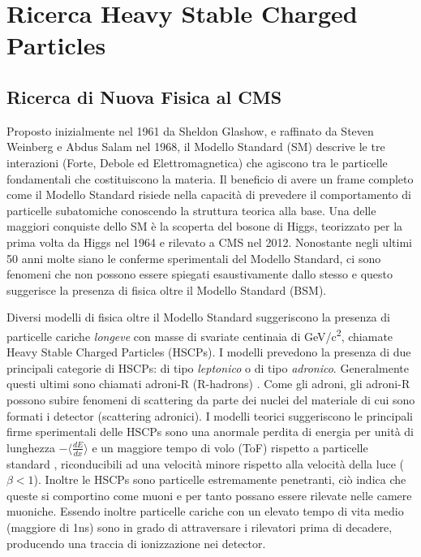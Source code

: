 \chapter{Ricerca Heavy Stable Charged Particles}
\label{cap:TerzoCapitolo}

\section{Ricerca di Nuova Fisica al CMS}
\label{sec:NewPhysics}

Proposto inizialmente nel 1961 da Sheldon Glashow, e raffinato da Steven Weinberg e Abdus Salam nel 1968, il Modello Standard (SM) descrive le tre interazioni (Forte, Debole ed Elettromagnetica) che agiscono tra le particelle fondamentali che costituiscono la materia. Il beneficio di avere un frame completo come il Modello Standard risiede nella capacità di prevedere il comportamento di particelle subatomiche conoscendo la struttura teorica alla base. Una delle maggiori conquiste dello SM è la scoperta del bosone di Higgs, teorizzato per la prima volta da Higgs nel 1964 e rilevato a CMS nel 2012. \newline
Nonostante negli ultimi 50 anni molte siano le conferme sperimentali del Modello Standard, ci sono fenomeni che non possono essere spiegati esaustivamente dallo stesso e questo suggerisce la presenza di fisica oltre il Modello Standard (BSM).

Diversi modelli di fisica oltre il Modello Standard suggeriscono la presenza di particelle cariche \textit{longeve} con masse di svariate centinaia di \si{GeV/c^2}, chiamate Heavy Stable Charged Particles (HSCPs). I modelli prevedono la presenza di due principali categorie di HSCPs: di tipo \textit{leptonico} o di tipo \textit{adronico}. Generalmente questi ultimi sono chiamati adroni-R (R-hadrons) \cite{Quertenmont:2010ota}. \newline
Come gli adroni, gli adroni-R possono subire fenomeni di scattering da parte dei nuclei del materiale di cui sono formati i detector (scattering adronici). I modelli teorici suggeriscono le principali firme sperimentali delle HSCPs sono una anormale perdita di energia per unità di lunghezza $- \langle \frac{dE}{dx}\rangle$ e un maggiore tempo di volo (ToF) rispetto a particelle standard \cite{MasterThesisGioMoc}, riconducibili ad una velocità minore rispetto alla velocità della luce ($\beta < 1$). Inoltre le HSCPs sono particelle estremamente penetranti, ciò indica che queste si comportino come muoni e per tanto possano essere rilevate nelle camere muoniche. \newline
Essendo inoltre particelle cariche con un elevato tempo di vita medio (maggiore di 1ns) sono in grado di attraversare i rilevatori prima di decadere, producendo una traccia di ionizzazione nei detector.


